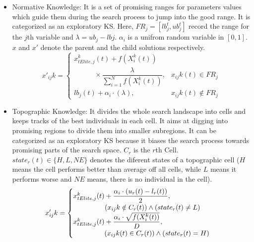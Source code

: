 \documentclass[letterpaper]{article}
\begin{document}
\begin{itemize}
	\item Normative Knowledge: It is a set of promising ranges for parameters values which guide them during the search process to jump into the good range. It is categorized as an exploratory KS. Here, $FR_{j}=[lb_{j}^{t}, ub_{j}^{t}]$ record the range for the $j$th variable and $\lambda=ub_{j}-lb{j}$. $\alpha_{i}$ is a unifrom random variable in $[0, 1]$. $x$ and $x'$ denote the parent and the child solutions respectively.
	\begin{equation}
		x'_{ij}{k}=\begin{cases}
		x_{tElite,j}^{k}(t)+f(X_{i}^{k}(t)) \\ \hspace{35pt} \times \dfrac{\lambda}{\sum_{i=1}^{N}f(X_{i}^{k}(t))}, & x_{ij}{k}(t) \in FR_{j} \\ lb_{j}(t)+\alpha_{i}\cdot (\lambda), & x_{ij}{k}(t) \notin FR_{j}
		\end{cases}
	\end{equation}
	\item Topographic Knowledge: It divides the whole search landscape into cells and keeps tracks of the best individuals in each cell. It aims at digging into promising regions to divide them into smaller subregions. It can be categorized as an exploratory KS because it biases the search process towards promising parts of the search space. $C_{r}$ is the $r$th Cell. $state_{r}(t)\in \{H, L, NE\}$ denotes the diferent states of a topographic cell ($H$ means the cell performs better than average off all cells, while $L$ means it performs worse and $NE$ means, there is no individual in the cell). 
	\begin{equation}
		x'_{ij}{k}=\begin{cases}x_{tElite,j}^k(t)+\dfrac{\alpha_{i}\cdot(u_{r}(t)-l_{r}(t))}{2}, & \\ \hspace{16mm} (x_{ij}{k}\notin C_{r}(t))\wedge(state_{r}(t)\ne L) \\ x_{tElite,j}^k(t)+\dfrac{\alpha_{i}\cdot\sqrt{f(X_{i}^{k}(t))}}{D}, & \\ \hspace{45pt} (x_{ij}{k}(t)\in C_{r}(t))\wedge(state_{r}(t) = H)
		\end{cases}
	\end{equation}
\end{itemize}
\end{document}
